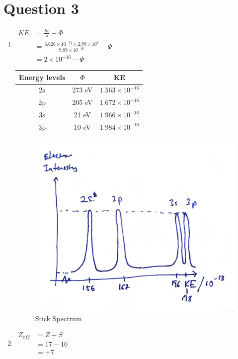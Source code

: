 \documentclass[a4paper, fleqn]{article}
\begin{document}
\section{Question 3}
\begin{enumerate}[label=(\alph{*})]
\item $\begin{aligned}KE&=\frac{hc}{\lambda}-\Phi\\&=\frac{6.626\times10^{-34}\times2.99\times10^8}{9.89\times10^{-10}}-\Phi\\&=2\times10^{-16}-\Phi\end{aligned}$
\begin{center}
\begin{tabular}{| c | c | c |}
\hline
Energy levels & $\Phi$ & KE\\
\hline
2s & 273 eV & $1.563\times10^{-16}$\\
2p & 205 eV & $1.672\times10^{-16}$\\
3s & 21 eV & $1.966\times10^{-16}$\\
3p & 10 eV & $1.984\times10^{-16}$\\
\hline
\end{tabular}
\end{center}
\begin{figure}[h!]
\includegraphics[width=\linewidth]{./assets/201802120534.jpg}
\caption{Stick Spectrum}
\label{figure:graph2}
\end{figure}
\item $\begin{aligned}Z_{eff}&=Z-S\\&= 17-10\\&=+7\end{aligned}$
\end{enumerate}
\pagebreak
\end{document}
